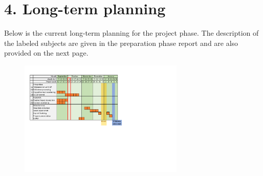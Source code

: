 \documentclass[11pt]{report}
\numberwithin{equation}{section}        %
\numberwithin{figure}{section}          %
\numberwithin{table}{section}           %
\begin{document}
  \section*{4. Long-term planning}
  Below is the current long-term planning for the project phase. The description of the labeled subjects are given in the preparation phase report and are also provided on the next page.

  \begin{figure}[H]
  \centering
  \includegraphics[width=0.7\textwidth, trim={0.87cm 9.5cm 10cm 1.5cm},clip]{Graphics/planning v2.pdf}

  \label{fig:my_label}
  \end{figure}
\end{document}
